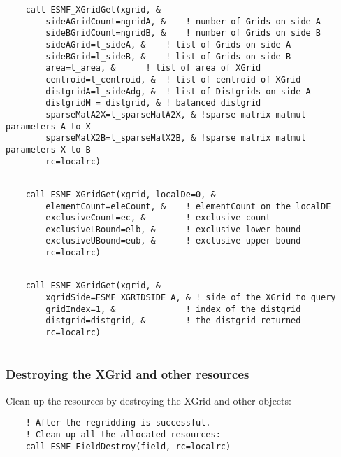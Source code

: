  \begin{verbatim}
    call ESMF_XGridGet(xgrid, &
        sideAGridCount=ngridA, &    ! number of Grids on side A
        sideBGridCount=ngridB, &    ! number of Grids on side B
        sideAGrid=l_sideA, &    ! list of Grids on side A
        sideBGrid=l_sideB, &    ! list of Grids on side B
        area=l_area, &      ! list of area of XGrid
        centroid=l_centroid, &  ! list of centroid of XGrid
        distgridA=l_sideAdg, &  ! list of Distgrids on side A
        distgridM = distgrid, & ! balanced distgrid
        sparseMatA2X=l_sparseMatA2X, & !sparse matrix matmul parameters A to X
        sparseMatX2B=l_sparseMatX2B, & !sparse matrix matmul parameters X to B
        rc=localrc)
 
\end{verbatim}
 

 \begin{verbatim}
    call ESMF_XGridGet(xgrid, localDe=0, &
        elementCount=eleCount, &    ! elementCount on the localDE
        exclusiveCount=ec, &        ! exclusive count
        exclusiveLBound=elb, &      ! exclusive lower bound
        exclusiveUBound=eub, &      ! exclusive upper bound
        rc=localrc)
 
\end{verbatim}
 

 \begin{verbatim}
    call ESMF_XGridGet(xgrid, &
        xgridSide=ESMF_XGRIDSIDE_A, & ! side of the XGrid to query
        gridIndex=1, &              ! index of the distgrid
        distgrid=distgrid, &        ! the distgrid returned
        rc=localrc)
 
\end{verbatim}
 

  \subsubsection{Destroying the XGrid and other resources}
  \label{sec:xgrid:usage:xgrid_destroy}
   Clean up the resources by destroying the XGrid and other objects: 

 \begin{verbatim}
    ! After the regridding is successful.
    ! Clean up all the allocated resources:
    call ESMF_FieldDestroy(field, rc=localrc)
 
\end{verbatim}
 
